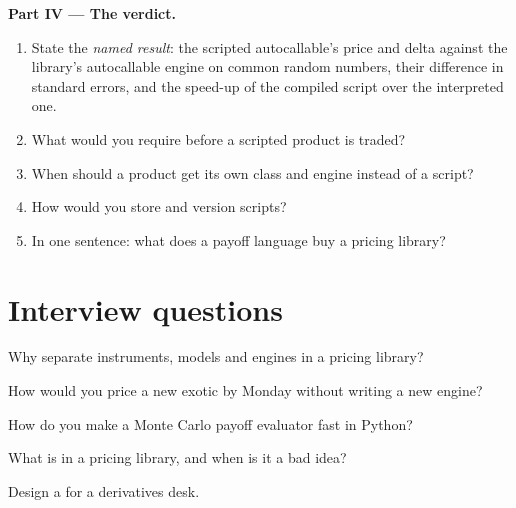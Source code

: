 \begin{problem}
\medskip\noindent\textbf{Part IV --- The verdict.}
\begin{enumerate}[resume]
\item State the \emph{named result}: the scripted autocallable's price and delta against the library's autocallable engine on common random
numbers, their difference in standard errors, and the speed-up of the compiled script over the interpreted one.
\item What would you require before a scripted product is traded?
\item When should a product get its own class and engine instead of a script?
\item How would you store and version scripts?
\item In one sentence: what does a payoff language buy a pricing library?
\end{enumerate}
\end{problem}

\section{Interview questions}

\begin{interviewq}\label{iq:pl:pricing-library-architecture:1}
Why separate instruments, models and engines in a pricing library?
\end{interviewq}

\begin{interviewq}\label{iq:pl:pricing-library-architecture:2}
How would you price a new exotic by Monday without writing a new engine?
\end{interviewq}

\begin{interviewq}\label{iq:pl:pricing-library-architecture:3}
How do you make a Monte Carlo payoff evaluator fast in Python?
\end{interviewq}

\begin{interviewq}\label{iq:pl:pricing-library-architecture:4}
What is  in a pricing library, and when is it a bad idea?
\end{interviewq}

\begin{interviewq}\label{iq:pl:pricing-library-architecture:5}
Design a  for a derivatives desk.
\end{interviewq}
